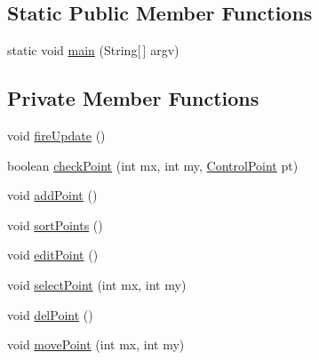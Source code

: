 \subsection*{Static Public Member Functions}
\begin{DoxyCompactItemize}
\item 
static void \mbox{\hyperlink{classorg_1_1newdawn_1_1slick_1_1tools_1_1peditor_1_1_gradient_editor_aa02e60ceb1decda1145b78a28fb2d29b}{main}} (String\mbox{[}$\,$\mbox{]} argv)
\end{DoxyCompactItemize}
\subsection*{Private Member Functions}
\begin{DoxyCompactItemize}
\item 
void \mbox{\hyperlink{classorg_1_1newdawn_1_1slick_1_1tools_1_1peditor_1_1_gradient_editor_aaafac407b447cb37d6f3c204681382bd}{fire\+Update}} ()
\item 
boolean \mbox{\hyperlink{classorg_1_1newdawn_1_1slick_1_1tools_1_1peditor_1_1_gradient_editor_a5a178638b3d41be830a8f74c03ba83f2}{check\+Point}} (int mx, int my, \mbox{\hyperlink{classorg_1_1newdawn_1_1slick_1_1tools_1_1peditor_1_1_gradient_editor_1_1_control_point}{Control\+Point}} pt)
\item 
void \mbox{\hyperlink{classorg_1_1newdawn_1_1slick_1_1tools_1_1peditor_1_1_gradient_editor_a75ef0dd14d6417405b3ec6fdae5ab5ad}{add\+Point}} ()
\item 
void \mbox{\hyperlink{classorg_1_1newdawn_1_1slick_1_1tools_1_1peditor_1_1_gradient_editor_a86a44e97d8aca663dba524a63a28649b}{sort\+Points}} ()
\item 
void \mbox{\hyperlink{classorg_1_1newdawn_1_1slick_1_1tools_1_1peditor_1_1_gradient_editor_a8594cfc2e06e52a9a21e638f215aefaa}{edit\+Point}} ()
\item 
void \mbox{\hyperlink{classorg_1_1newdawn_1_1slick_1_1tools_1_1peditor_1_1_gradient_editor_acbffda211357cbe269f4d3390e7e0bb8}{select\+Point}} (int mx, int my)
\item 
void \mbox{\hyperlink{classorg_1_1newdawn_1_1slick_1_1tools_1_1peditor_1_1_gradient_editor_a0dad4490da85f874d00d6295abf3a58d}{del\+Point}} ()
\item 
void \mbox{\hyperlink{classorg_1_1newdawn_1_1slick_1_1tools_1_1peditor_1_1_gradient_editor_a30e2f666b4ba90807cab506b0547c87c}{move\+Point}} (int mx, int my)
\end{DoxyCompactItemize}
